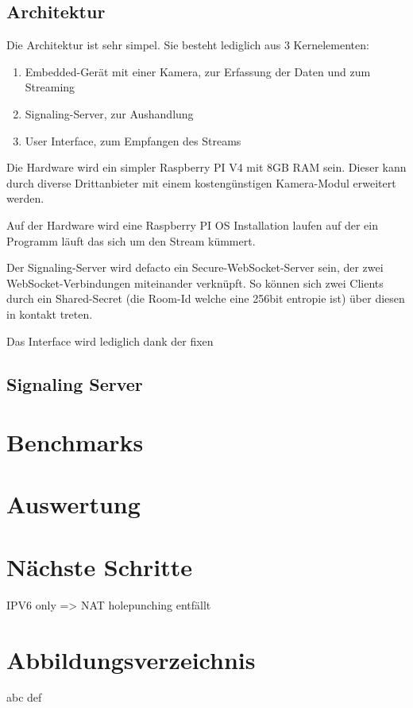 \documentclass[journal]{IEEEtran}
\begin{document}
\subsection{Architektur}

Die Architektur ist sehr simpel. Sie besteht lediglich aus 3 Kernelementen:

\begin{enumerate}
	\item Embedded-Gerät mit einer Kamera, zur Erfassung der Daten und zum
		Streaming
	\item Signaling-Server, zur Aushandlung
	\item User Interface, zum Empfangen des Streams
\end{enumerate}

Die Hardware wird ein simpler Raspberry PI V4 mit 8GB RAM sein. Dieser kann
durch diverse Drittanbieter mit einem kostengünstigen Kamera-Modul erweitert
werden.

Auf der Hardware wird eine Raspberry PI OS Installation laufen auf der ein
Programm läuft das sich um den Stream kümmert.

Der Signaling-Server wird defacto ein Secure-WebSocket-Server sein, der zwei
WebSocket-Verbindungen miteinander verknüpft. So können sich zwei Clients durch
ein Shared-Secret (die Room-Id welche eine 256bit entropie ist) über diesen in
kontakt treten.

Das Interface wird lediglich dank der fixen 

\subsection{Signaling Server}



\section{Benchmarks}

\section{Auswertung}

\section{Nächste Schritte}

\large{IPV6 only => NAT holepunching entfällt}

\section{Abbildungsverzeichnis}
abc
def



\end{document}
